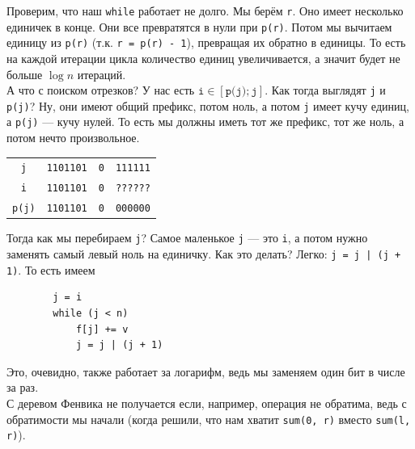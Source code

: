 \documentclass{article}
\newcommand{\pseudo}{PseudoLexer.py:PseudoLexer -x}
\newcommand{\pseudocode}[1]{\texttt{#1}}
\begin{document}
    \begin{center}
    \end{center}
    Проверим, что наш \pseudocode{while} работает не долго. Мы берём \pseudocode{r}. Оно имеет несколько единичек в конце. Они все превратятся в нули при \pseudocode{p(r)}. Потом мы вычитаем единицу из \pseudocode{p(r)} (т.к. \pseudocode{r = p(r) - 1}), превращая их обратно в единицы. То есть на каждой итерации цикла количество единиц увеличивается, а значит будет не больше $\log n$ итераций.\\
    А что с поиском отрезков? У нас есть $\pseudocode{i}\in[\pseudocode{p(j)};\pseudocode{j}]$. Как тогда выглядят \pseudocode{j} и \pseudocode{p(j)}? Ну, они имеют общий префикс, потом ноль, а потом \pseudocode{j} имеет кучу единиц, а \pseudocode{p(j)} --- кучу нулей. То есть мы должны иметь тот же префикс, тот же ноль, а потом нечто произвольное.
    \begin{center}
        \begin{tabular}{|c|r:c:l|}
            \hline
            \pseudocode{j} & \verb|1101101| & \verb|0| & \verb|111111|\\
            \pseudocode{i} & \verb|1101101| & \verb|0| & \verb|??????|\\
            \pseudocode{p(j)} & \verb|1101101| & \verb|0| & \verb|000000|\\
            \hline
        \end{tabular}
    \end{center}
    Тогда как мы перебираем \pseudocode{j}? Самое маленькое \pseudocode{j} --- это \pseudocode{i}, а потом нужно заменять самый левый ноль на единичку. Как это делать? Легко: \pseudocode{j = j | (j + 1)}. То есть имеем
    \begin{verbatim}
        j = i
        while (j < n)
            f[j] += v
            j = j | (j + 1)
    \end{verbatim}
    Это, очевидно, также работает за логарифм, ведь мы заменяем один бит в числе за раз.\\
    С деревом Фенвика не получается если, например, операция не обратима, ведь с обратимости мы начали (когда решили, что нам хватит \pseudocode{sum(0, r)} вместо \pseudocode{sum(l, r)}).
\end{document}
